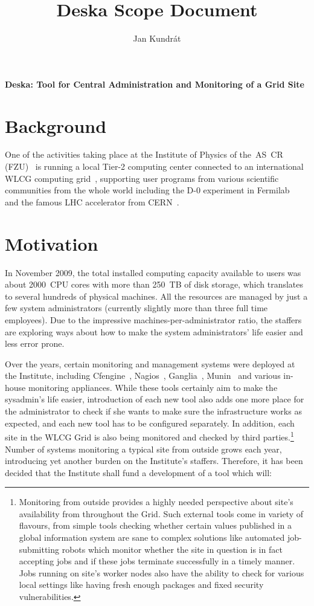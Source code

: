 \documentclass[12pt]{article}
\author{Jan Kundrát}
\title{Deska Scope Document}
\begin{document}
{\huge \textbf{Deska: Tool for Central Administration and Monitoring of a Grid Site}}

\vspace{0.5in}

\section{Background}

One of the activities taking place at the Institute of Physics of the~AS~CR (FZU)~\cite{fzu} is running a local Tier-2 computing center
connected to an international WLCG computing grid~\cite{wlcg}, supporting user programs from various scientific communities from
the whole world including the D-0 experiment in Fermilab~\cite{d0} and the famous LHC accelerator from CERN~\cite{lhc}.

\section{Motivation}

In November 2009, the total installed computing capacity available to users was about 2000~CPU cores with more than 250~TB of
disk storage, which translates to several hundreds of physical machines.  All the resources are managed by just a few system
administrators (currently slightly more than three full time employees).  Due to the impressive machines-per-administrator ratio,
the staffers are exploring ways about how to make the system administrators' life easier and less error prone.

Over the years, certain monitoring and management systems were deployed at the Institute, including Cfengine~\cite{cfengine},
Nagios~\cite{nagios}, Ganglia~\cite{ganglia}, Munin~\cite{munin} and various in-house monitoring appliances.  While these tools
certainly aim to make the sysadmin's life easier, introduction of each new tool also adds one more place for the administrator to
check if she wants to make sure the infrastructure works as expected, and each new tool has to be configured
separately.  In addition, each site in the WLCG Grid is also being monitored and checked by third parties.\footnote{Monitoring from
outside provides a highly needed perspective about site's availability from throughout the Grid.  Such external tools come in
variety of flavours, from simple tools checking whether certain values published in a global information system are sane to
complex solutions like automated job-submitting robots which monitor whether the site in question is in fact accepting jobs and if
these jobs terminate successfully in a timely manner.  Jobs running on site's worker nodes also have the ability to check for
various local settings like having fresh enough packages and fixed security vulnerabilities.}  Number of systems
monitoring a typical site from outside grows each year, introducing yet another burden on the Institute's staffers.  Therefore, it
has been decided that the Institute shall fund a development of a tool which will:
\end{document}
